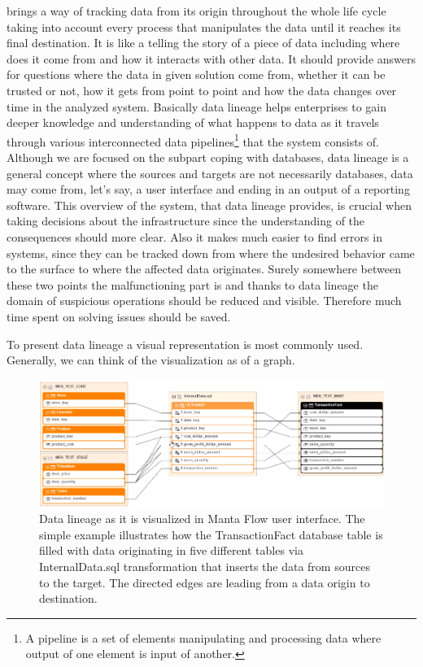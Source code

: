  brings a way of tracking data from its origin throughout the whole life cycle taking into account every process that manipulates the data until it reaches its final destination. It is like a telling the story of a piece of data including where does it come from and how it interacts with other data.
It should provide answers for questions where the data in given solution come from, whether it can be trusted or not, how it gets from point to point and how the data changes over time in the analyzed system.
Basically data lineage helps enterprises to gain deeper knowledge and understanding of what happens to data as it travels through various interconnected data pipelines\footnote{A pipeline is a set of elements manipulating and processing data where output of one element is input of another.} that the system consists of. Although we are focused on the subpart coping with databases, data lineage is a general concept where the sources and targets are not necessarily databases, data may come from, let's say, a user interface and ending in an output of a reporting software.
This overview of the system, that data lineage provides, is crucial when taking decisions about the infrastructure since the understanding of the consequences should more clear. Also it makes much easier to find errors in systems, since they can be tracked down from where the undesired behavior came to the surface to where the affected data originates. Surely somewhere between these two points the malfunctioning part is and thanks to data lineage the domain of suspicious operations should be reduced and visible. 
Therefore much time spent on solving issues should be saved.

To present data lineage a visual representation is most commonly used. Generally, we can think of the visualization as of a graph.

\begin{figure}[H]
	\centering
	\includegraphics[width=14cm]{../img/DataLineageExample}
	\caption[Data Lineage Visualization]{Data lineage as it is visualized in Manta Flow user interface. The simple example illustrates how the TransactionFact database table is filled with data originating in five different tables via InternalData.sql transformation that inserts the data from sources to the target. The directed edges are leading from a data origin to destination.\cite{MantaExample}}
\end{figure}

